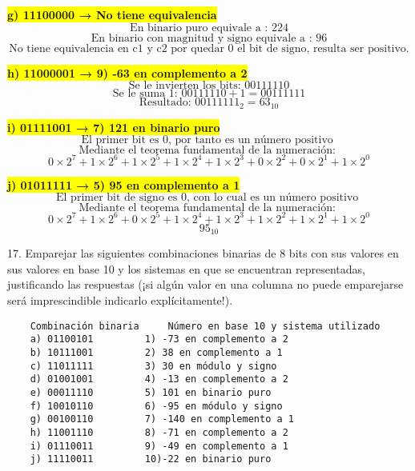 \documentclass[a4paper,12pt]{article}
\begin{document}
	\begin{center}
	\colorbox{yellow}{{\textbf{g) 11100000 → No tiene equivalencia }}}
		\[
		\text{En binario puro equivale a : } 224
		\]
		\[
		\text{En binario con magnitud y signo equivale a : 96} 
		\]
		\[
		\text{No tiene equivalencia en c1 y c2 por quedar 0 el bit de signo, resulta ser positivo.}
		\]
	\end{center}

	\begin{center}
		\colorbox{yellow}{{\textbf{h) 11000001 → 9) -63 en complemento a 2}}}
		\[
		\text{Se le invierten los bits: } 00111110
		\]
		\[
		\text{Se le suma 1: } 00111110 + 1 = 00111111
		\]
		\[
		\boxed{\text{Resultado: } 00111111_2 = 63_{10}}
		\]
	\end{center}

	\begin{center}
		\colorbox{yellow}{{\textbf{i) 01111001 → 7) 121 en binario puro}}}
		\[
		\text{El primer bit es 0, por tanto es un número positivo }
		\]
		\[
		{\text{Mediante el teorema fundamental de la numeración: } }
		\]
		\[
		0\times2^{7} + 1\times2^{6} + 1\times2^{5} + 1\times2^{4} + 1\times2^{3} + 0\times2^{2} + 0\times2^{1} + 1\times2^{0}
		\]
	\end{center}

	\begin{center}
		\colorbox{yellow}{{\textbf{j) 01011111 → 5) 95 en complemento a 1}}}
		\[
		\text{El primer bit de signo es 0, con lo cual es un número positivo }
		\]
		\[
		{\text{Mediante el teorema fundamental de la numeración: } }
		\]
		\[
		0\times2^{7} + 1\times2^{6} + 0\times2^{5} + 1\times2^{4} + 1\times2^{3} + 1\times2^{2} + 1\times2^{1} + 1\times2^{0} 
		\]
		\[ 
		\boxed{ 95_{10} } 
		\]	
	\end{center}

	17. Emparejar las siguientes combinaciones binarias de 8 bits con sus valores en sus valores en base 10 y los sistemas en que se encuentran representadas, justificando las respuestas (¡si algún valor en una columna no puede emparejarse será imprescindible indicarlo explícitamente!).
\begin{Verbatim}
	Combinación binaria 	Número en base 10 y sistema utilizado
	a) 01100101			1) -73 en complemento a 2
	b) 10111001			2) 38 en complemento a 1
	c) 11011111			3) 30 en módulo y signo
	d) 01001001			4) -13 en complemento a 2
	e) 00011110			5) 101 en binario puro
	f) 10010110			6) -95 en módulo y signo
	g) 00100110			7) -140 en complemento a 1 
	h) 11001110			8) -71 en complemento a 2
	i) 01110011			9) -49 en complemento a 1
	j) 11110011			10)-22 en binario puro
\end{Verbatim}
\end{document}
